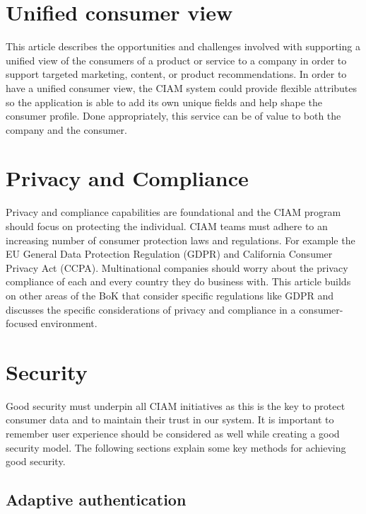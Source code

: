 \hypertarget{unified-consumer-view}{%
\section{Unified consumer view}\label{unified-consumer-view}}

This article describes the opportunities and challenges involved with
supporting a unified view of the consumers of a product or service to a
company in order to support targeted marketing, content, or product
recommendations. In order to have a unified consumer view, the CIAM
system could provide flexible attributes so the application is able to
add its own unique fields and help shape the consumer profile. Done
appropriately, this service can be of value to both the company and the
consumer.

\hypertarget{privacy-and-compliance}{%
\section{Privacy and Compliance}\label{privacy-and-compliance}}

Privacy and compliance capabilities are foundational and the CIAM
program should focus on protecting the individual. CIAM teams must
adhere to an increasing number of consumer protection laws and
regulations. For example the EU General Data Protection Regulation
(GDPR) and California Consumer Privacy Act (CCPA). Multinational
companies should worry about the privacy compliance of each and every
country they do business with. This article builds on other areas of the
BoK that consider specific regulations like GDPR and discusses the
specific considerations of privacy and compliance in a consumer-focused
environment.

\hypertarget{security}{%
\section{Security}\label{security}}

Good security must underpin all CIAM initiatives as this is the key to
protect consumer data and to maintain their trust in our system. It is
important to remember user experience should be considered as well while
creating a good security model. The following sections explain some key
methods for achieving good security.

\hypertarget{adaptive-authentication}{%
\subsection{Adaptive authentication}\label{adaptive-authentication}}

